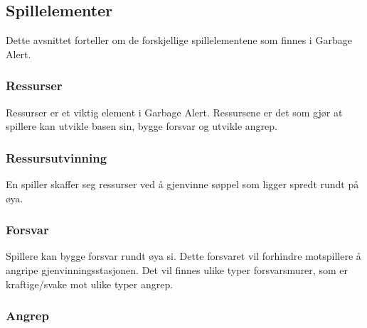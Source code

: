 

\subsection{Spillelementer}
Dette avsnittet forteller om de forskjellige spillelementene som finnes
i Garbage Alert.
\subsubsection{Ressurser}
Ressurser er et viktig element i Garbage Alert. Ressursene er det som
gjør at spillere kan utvikle basen sin, bygge forsvar og utvikle angrep.
\subsubsection{Ressursutvinning}
En spiller skaffer seg ressurser ved å gjenvinne søppel som ligger
spredt rundt på øya.
\subsubsection{Forsvar}
Spillere kan bygge forsvar rundt øya si. Dette forsvaret vil forhindre
motspillere å angripe gjenvinningsstasjonen. Det vil finnes ulike typer
forsvarsmurer, som er kraftige/svake mot ulike typer angrep.
\subsubsection{Angrep}

